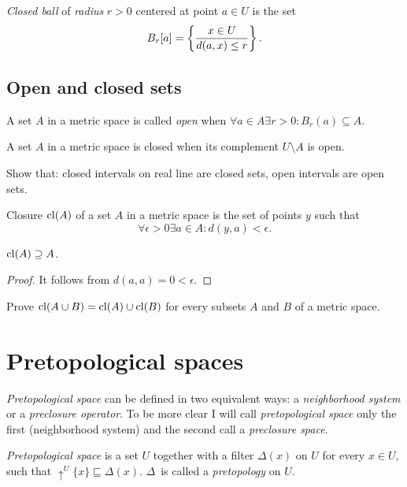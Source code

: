\begin{defn}
\emph{Closed ball} of \emph{radius} $r>0$ centered
at point $a\in U$ is the set
\[
B_{r}[a]=\left\{ \frac{x\in U}{d(a,x)\le r}\right\}.
\]

\end{defn}

\subsection{Open and closed sets}
\begin{defn}
A set $A$ in a metric space is called
\emph{open} when $\forall a\in A\exists r>0:B_{r}(a)\subseteq A$.
\end{defn}

\begin{defn}
A set $A$ in a metric space is
closed when its complement $U\setminus A$ is open.
\end{defn}

\begin{xca}
Show that: closed intervals on real line are closed sets, open intervals are open sets.
\end{xca}

\begin{defn}
Closure $\operatorname{cl}(A)$ of a set $A$ in
a metric space is the set of points $y$ such that
\[
\forall\epsilon>0\exists a\in A:d(y,a)<\epsilon.
\]
\end{defn}
\begin{prop}
$\operatorname{cl}(A)\supseteq A$.\end{prop}
\begin{proof}
It follows from $d(a,a)=0<\epsilon$.\end{proof}
\begin{xca}
Prove $\operatorname{cl}(A\cup B)=\operatorname{cl}(A)\cup\operatorname{cl}(B)$ for every subsets $A$ and
$B$ of a metric space.
\end{xca}

\section{Pretopological spaces}

\emph{Pretopological space} can be defined in two equivalent ways:
a \emph{neighborhood system} or a \emph{preclosure operator}. To be
more clear I will call \emph{pretopological space} only the first
(neighborhood system) and the second call a \emph{preclosure space}.
\begin{defn}
\emph{Pretopological
space} is a set $U$ together with a filter $\Delta(x)$ on \emph{$U$}
for every $x\in U$, such that $\uparrow^{U}\{x\}\sqsubseteq\Delta(x)$.
$\Delta$~is called a \emph{pretopology} on $U$.
\end{defn}


